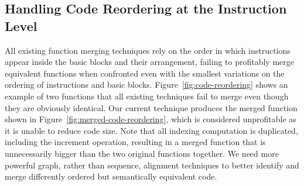 
\subsection{Handling Code Reordering at the Instruction Level}

All existing function merging techniques rely on the order in which instructions appear inside the basic blocks and their arrangement,
failing to profitably merge equivalent functions when confronted even with the smallest variations on the ordering of instructions and basic blocks.
Figure~\ref{fig:code-reordering} shows an example of two functions that all existing techniques fail to merge even though they are obviously identical.
Our current technique produces the merged function shown in Figure~\ref{fig:merged-code-reordering}, which is considered unprofitable as it is unable to reduce code size.
Note that all indexing computation is duplicated, including the increment operation, resulting in a merged function that is unnecessarily bigger than the two original functions together.
We need more powerful graph, rather than sequence, alignment techniques to better identify and merge differently ordered but semantically equivalent code.

